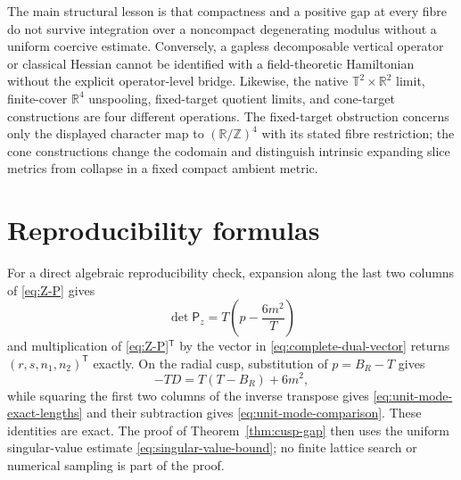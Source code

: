 \documentclass[11pt]{article}
\numberwithin{equation}{section}
\theoremstyle{definition}
\theoremstyle{remark}
\newcommand{\R}{\mathbb R}
\newcommand{\Z}{\mathbb Z}
\newcommand{\T}{\mathbb T}
\begin{document}
The main structural lesson is that compactness and a positive gap at every
fibre do not survive integration over a noncompact degenerating modulus
without a uniform coercive estimate.  Conversely, a gapless decomposable
vertical operator or classical Hessian cannot be identified with a
field-theoretic Hamiltonian without the explicit operator-level bridge.
Likewise, the native $\T^2\times\R^2$ limit, finite-cover $\R^4$ unspooling,
fixed-target quotient limits, and cone-target constructions are four
different operations.  The fixed-target obstruction concerns only the
displayed character map to $(\R/\Z)^4$ with its stated fibre restriction;
the cone constructions change the codomain and distinguish intrinsic
expanding slice metrics from collapse in a fixed compact ambient metric.

\appendix
\section{Reproducibility formulas}

For a direct algebraic reproducibility check, expansion along the last two
columns of \eqref{eq:Z-P} gives
\[
 \det\mathsf P_z=T\left(p-\frac{6m^2}{T}\right)
\]
and multiplication of \eqref{eq:Z-P}$^{\mathsf T}$ by the vector in
\eqref{eq:complete-dual-vector} returns $(r,s,n_1,n_2)^{\mathsf T}$ exactly.
On the radial cusp, substitution of $p=B_R-T$ gives
\[
 -TD=T(T-B_R)+6m^2,
\]
while squaring the first two columns of the inverse transpose gives
\eqref{eq:unit-mode-exact-lengths} and their subtraction gives
\eqref{eq:unit-mode-comparison}.  These identities are exact.  The proof of
Theorem~\ref{thm:cusp-gap} then uses the uniform singular-value estimate
\eqref{eq:singular-value-bound}; no finite lattice search or numerical
sampling is part of the proof.



\end{document}
